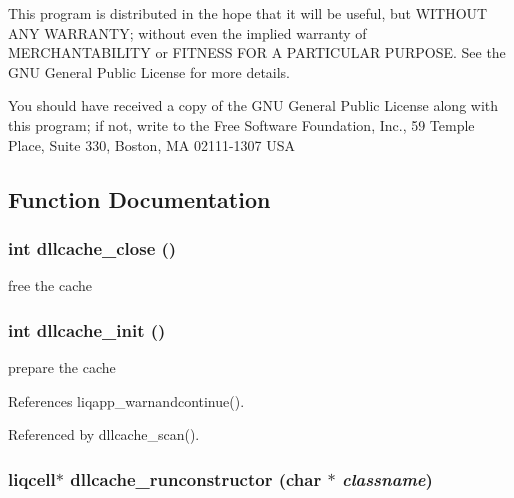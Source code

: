 This program is distributed in the hope that it will be useful, but WITHOUT ANY WARRANTY; without even the implied warranty of MERCHANTABILITY or FITNESS FOR A PARTICULAR PURPOSE. See the GNU General Public License for more details.

You should have received a copy of the GNU General Public License along with this program; if not, write to the Free Software Foundation, Inc., 59 Temple Place, Suite 330, Boston, MA 02111-1307 USA 

\subsection{Function Documentation}
\subsubsection[{dllcache\_\-close}]{\setlength{\rightskip}{0pt plus 5cm}int dllcache\_\-close ()}\label{d4/d58/liqcell__dllcache_8c_a688429991cabb39489e6b540b3ff59c}


free the cache 
\subsubsection[{dllcache\_\-init}]{\setlength{\rightskip}{0pt plus 5cm}int dllcache\_\-init ()}\label{d4/d58/liqcell__dllcache_8c_eb43d75f9ed377739b016706e5f9fa40}


prepare the cache 

References liqapp\_\-warnandcontinue().

Referenced by dllcache\_\-scan().
\subsubsection[{dllcache\_\-runconstructor}]{\setlength{\rightskip}{0pt plus 5cm}liqcell$\ast$ dllcache\_\-runconstructor (char $\ast$ {\em classname})}\label{d4/d58/liqcell__dllcache_8c_01563dab90d1a06c72a24fbfacd87640}


